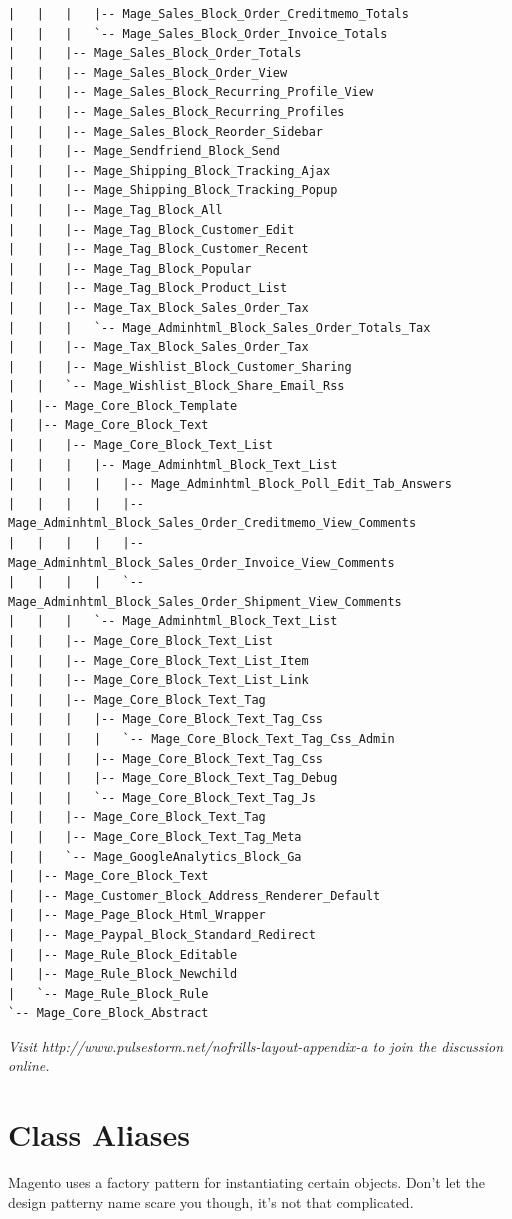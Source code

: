 \documentclass[oneside]{book}
\begin{document}
\begin{lstlisting}
|   |   |   |-- Mage_Sales_Block_Order_Creditmemo_Totals
|   |   |   `-- Mage_Sales_Block_Order_Invoice_Totals
|   |   |-- Mage_Sales_Block_Order_Totals
|   |   |-- Mage_Sales_Block_Order_View
|   |   |-- Mage_Sales_Block_Recurring_Profile_View
|   |   |-- Mage_Sales_Block_Recurring_Profiles
|   |   |-- Mage_Sales_Block_Reorder_Sidebar
|   |   |-- Mage_Sendfriend_Block_Send
|   |   |-- Mage_Shipping_Block_Tracking_Ajax
|   |   |-- Mage_Shipping_Block_Tracking_Popup
|   |   |-- Mage_Tag_Block_All
|   |   |-- Mage_Tag_Block_Customer_Edit
|   |   |-- Mage_Tag_Block_Customer_Recent
|   |   |-- Mage_Tag_Block_Popular
|   |   |-- Mage_Tag_Block_Product_List
|   |   |-- Mage_Tax_Block_Sales_Order_Tax
|   |   |   `-- Mage_Adminhtml_Block_Sales_Order_Totals_Tax
|   |   |-- Mage_Tax_Block_Sales_Order_Tax
|   |   |-- Mage_Wishlist_Block_Customer_Sharing
|   |   `-- Mage_Wishlist_Block_Share_Email_Rss
|   |-- Mage_Core_Block_Template
|   |-- Mage_Core_Block_Text
|   |   |-- Mage_Core_Block_Text_List
|   |   |   |-- Mage_Adminhtml_Block_Text_List
|   |   |   |   |-- Mage_Adminhtml_Block_Poll_Edit_Tab_Answers
|   |   |   |   |-- Mage_Adminhtml_Block_Sales_Order_Creditmemo_View_Comments
|   |   |   |   |-- Mage_Adminhtml_Block_Sales_Order_Invoice_View_Comments
|   |   |   |   `-- Mage_Adminhtml_Block_Sales_Order_Shipment_View_Comments
|   |   |   `-- Mage_Adminhtml_Block_Text_List
|   |   |-- Mage_Core_Block_Text_List
|   |   |-- Mage_Core_Block_Text_List_Item
|   |   |-- Mage_Core_Block_Text_List_Link
|   |   |-- Mage_Core_Block_Text_Tag
|   |   |   |-- Mage_Core_Block_Text_Tag_Css
|   |   |   |   `-- Mage_Core_Block_Text_Tag_Css_Admin
|   |   |   |-- Mage_Core_Block_Text_Tag_Css
|   |   |   |-- Mage_Core_Block_Text_Tag_Debug
|   |   |   `-- Mage_Core_Block_Text_Tag_Js
|   |   |-- Mage_Core_Block_Text_Tag
|   |   |-- Mage_Core_Block_Text_Tag_Meta
|   |   `-- Mage_GoogleAnalytics_Block_Ga
|   |-- Mage_Core_Block_Text
|   |-- Mage_Customer_Block_Address_Renderer_Default
|   |-- Mage_Page_Block_Html_Wrapper
|   |-- Mage_Paypal_Block_Standard_Redirect
|   |-- Mage_Rule_Block_Editable
|   |-- Mage_Rule_Block_Newchild
|   `-- Mage_Rule_Block_Rule
`-- Mage_Core_Block_Abstract

\end{lstlisting}


\emph{Visit http://www.pulsestorm.net/nofrills-layout-appendix-a to join the discussion online.}
\chapter{Class Aliases}
Magento uses a factory pattern for instantiating certain objects. Don't let the design patterny name scare you though, it's not that complicated.
\end{document}
